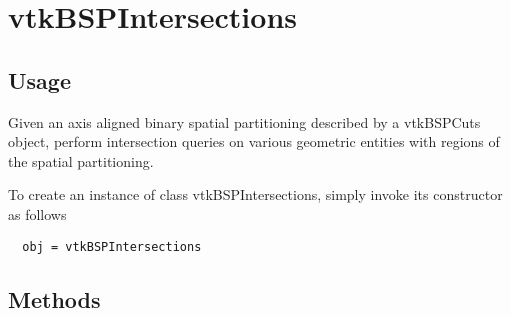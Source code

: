 \section{vtkBSPIntersections}

\subsection{Usage}

    Given an axis aligned binary spatial partitioning described by a
    vtkBSPCuts object, perform intersection queries on various
    geometric entities with regions of the spatial partitioning.


To create an instance of class vtkBSPIntersections, simply
invoke its constructor as follows
\begin{verbatim}
  obj = vtkBSPIntersections
\end{verbatim}
\subsection{Methods}


